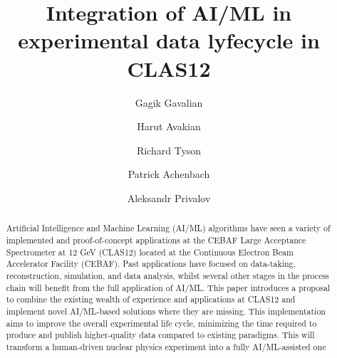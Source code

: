 \documentclass[11pt,titlepage]{article}
\title{Integration of AI/ML in experimental data lyfecycle in CLAS12}
\author{Gagik Gavalian}
\author{Harut Avakian}
\author{Richard Tyson}
\author{Patrick Achenbach}
\affil{Jefferson Lab, Newport News, VA, USA}
\author{Aleksandr Privalov}
\affil{NIIChaVo}
\begin{document}

\maketitle

\begin{abstract}
    Artificial Intelligence and Machine Learning (AI/ML) algorithms have seen a variety of implemented 
    and proof-of-concept applications at the CEBAF Large Acceptance Spectrometer at 12 GeV (CLAS12) located 
    at the Continuous Electron Beam Accelerator Facility (CEBAF). Past applications have focused on data-taking, 
    reconstruction, simulation, and data analysis, whilst several other stages in the process chain will benefit 
    from the full application of AI/ML. This paper introduces a proposal to combine the existing 
    wealth of experience and applications at CLAS12 and implement novel AI/ML-based solutions where they are missing. 
    This implementation aims to improve the overall experimental life cycle, minimizing the time required to produce and 
    publish higher-quality data compared to existing paradigms. This will transform a human-driven nuclear 
    physics experiment into a fully AI/ML-assisted one
\end{abstract}











%
%





\end{document}
